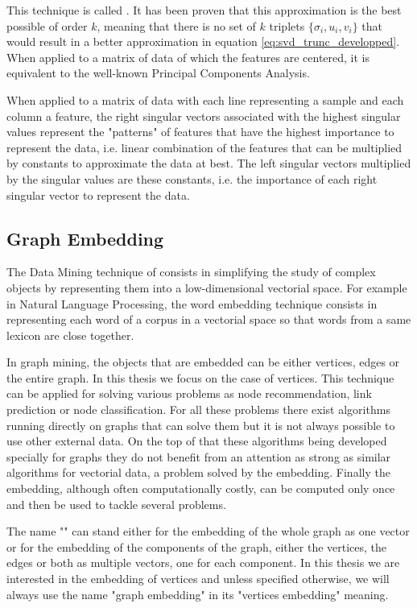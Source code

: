 This technique is called . It has been proven that this approximation is the best possible of order $k$, meaning that there is no set of $k$ triplets $\{\sigma_i, u_i, v_i\}$ that would result in a better approximation in equation \ref{eq:svd_trunc_developped}. When applied to a matrix of data of which the features are centered, it is equivalent to the well-known Principal Components Analysis.

When applied to a matrix of data with each line representing a sample and each column a feature, the right singular vectors associated with the highest singular values represent the "patterns" of features that have the highest importance to represent the data, i.e. linear combination of the features that can be multiplied by constants to approximate the data at best. The left singular vectors multiplied by the singular values are these constants, i.e. the importance of each right singular vector to represent the data.

\subsection{Graph Embedding}\label{subsec:intro_graph_embedding}
The Data Mining technique of  consists in simplifying the study of complex objects by representing them into a low-dimensional vectorial space. For example in Natural Language Processing, the word embedding technique consists in representing each word of a corpus in a vectorial space so that words from a same lexicon are close together.

In graph mining, the objects that are embedded can be either vertices, edges or the entire graph. In this thesis we focus on the case of vertices. This technique can be applied for solving various problems as node recommendation, link prediction or node classification. For all these problems there exist algorithms running directly on graphs that can solve them but it is not always possible to use other external data. On the top of that these algorithms being developed specially for graphs they do not benefit from an attention as strong as similar algorithms for vectorial data, a problem solved by the embedding. Finally the embedding, although often computationally costly, can be computed only once and then be used to tackle several problems. 

The name "" can stand either for the embedding of the whole graph as one vector or for the embedding of the components of the graph, either the vertices, the edges or both as multiple vectors, one for each component. In this thesis we are interested in the embedding of vertices and unless specified otherwise, we will always use the name "graph embedding" in its "vertices embedding" meaning.


